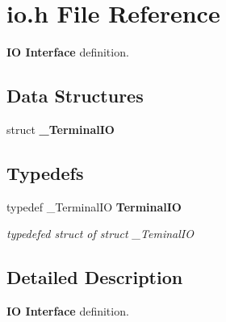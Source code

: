 \section{io.h File Reference}
\label{io_8h}
{\bf IO Interface } definition. 


\subsection*{Data Structures}
\begin{CompactItemize}
\item 
struct {\bf \_\-Terminal\-IO}
\end{CompactItemize}
\subsection*{Typedefs}
\begin{CompactItemize}
\item 
{}
typedef \_\-Terminal\-IO {\bf Terminal\-IO}\label{io_8h_a0}

\begin{CompactList}\small\item\em typedefed struct of struct \_\-Teminal\-IO\item\end{CompactList}\end{CompactItemize}


\subsection{Detailed Description}
{\bf IO Interface } definition.

